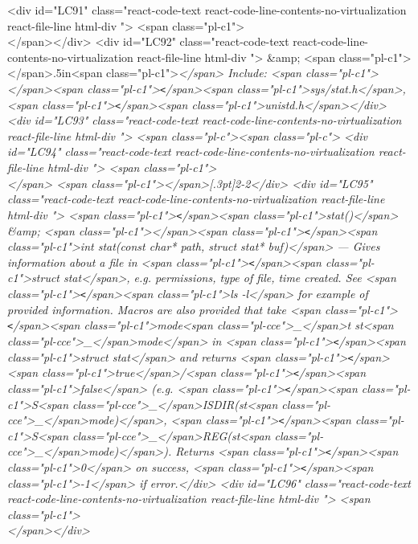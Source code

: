 {{{{{<div id="LC91" class="react-code-text react-code-line-contents-no-virtualization react-file-line html-div ">        <span class="pl-c1">\\</span></div>
<div id="LC92" class="react-code-text react-code-line-contents-no-virtualization react-file-line html-div ">    &amp; <span class="pl-c1">\hspace</span>{.5in}<span class="pl-c1">\it</span> Include: <span class="pl-c1">\rm</span><span class="pl-c1">\texttt</span>{<span class="pl-c1">sys/stat.h</span>}, <span class="pl-c1">\texttt</span>{<span class="pl-c1">unistd.h</span>}</div>
<div id="LC93" class="react-code-text react-code-line-contents-no-virtualization react-file-line html-div ">        <span class="pl-c"><span class="pl-c">%
<div id="LC94" class="react-code-text react-code-line-contents-no-virtualization react-file-line html-div ">        <span class="pl-c1">\\</span> <span class="pl-c1">\tabucline</span>[.3pt]{2-2}</div>
<div id="LC95" class="react-code-text react-code-line-contents-no-virtualization react-file-line html-div ">    <span class="pl-c1">\texttt</span>{<span class="pl-c1">stat()</span>} &amp; <span class="pl-c1">\indenth</span><span class="pl-c1">\texttt</span>{<span class="pl-c1">int stat(const char* path,  struct stat* buf)</span>} --- Gives information about a file in <span class="pl-c1">\texttt</span>{<span class="pl-c1">struct stat</span>}, e.g. permissions, type of file, time created. See <span class="pl-c1">\texttt</span>{<span class="pl-c1">ls -l</span>} for example of provided information. Macros are also provided that take <span class="pl-c1">\texttt</span>{<span class="pl-c1">mode<span class="pl-cce">\_</span>t st<span class="pl-cce">\_</span>mode</span>} in <span class="pl-c1">\texttt</span>{<span class="pl-c1">struct stat</span>} and returns <span class="pl-c1">\texttt</span>{<span class="pl-c1">true</span>}/<span class="pl-c1">\texttt</span>{<span class="pl-c1">false</span>} (e.g. <span class="pl-c1">\texttt</span>{<span class="pl-c1">S<span class="pl-cce">\_</span>ISDIR(st<span class="pl-cce">\_</span>mode)</span>}, <span class="pl-c1">\texttt</span>{<span class="pl-c1">S<span class="pl-cce">\_</span>REG(st<span class="pl-cce">\_</span>mode)</span>}). Returns <span class="pl-c1">\texttt</span>{<span class="pl-c1">0</span>} on success, <span class="pl-c1">\texttt</span>{<span class="pl-c1">-1</span>} if error.</div>
<div id="LC96" class="react-code-text react-code-line-contents-no-virtualization react-file-line html-div ">        <span class="pl-c1">\\</span></div>
}}}}}
